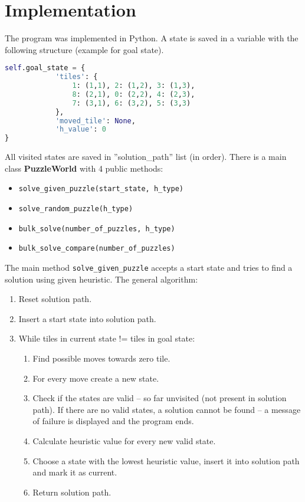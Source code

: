 \documentclass{article}
\begin{document}
\section{Implementation}
The program was implemented in Python. A state is saved in a variable with the following structure (example for goal state).
\begin{lstlisting}[language=python]
self.goal_state = {
            'tiles': {
                1: (1,1), 2: (1,2), 3: (1,3),
                8: (2,1), 0: (2,2), 4: (2,3),
                7: (3,1), 6: (3,2), 5: (3,3)
            },
            'moved_tile': None,
            'h_value': 0
}
\end{lstlisting}
All visited states are saved in ''solution\_path'' list (in order). There is a main class \textbf{PuzzleWorld} with 4 public methods: 
\begin{itemize}
\item \verb|solve_given_puzzle(start_state, h_type)|
\item \verb|solve_random_puzzle(h_type)|
\item \verb|bulk_solve(number_of_puzzles, h_type)|
\item \verb|bulk_solve_compare(number_of_puzzles)|
\end{itemize}

The main method \verb|solve_given_puzzle| accepts a start state and tries to find a solution using given heuristic. The general algorithm:
\begin{enumerate}
\item Reset solution path.
\item Insert a start state into solution path.
\item While tiles in current state != tiles in goal state:
	\begin{enumerate}
	\item Find possible moves towards zero tile.
           \item For every move create a new state.
           \item Check if the states are valid -- so far unvisited (not present in solution path). If there are no valid states, a solution cannot be found -- a message of failure is displayed and the program ends.
           \item Calculate heuristic value for every new valid state.
           \item Choose a state with the lowest heuristic value, insert it into solution path and mark it as current.
           \item Return solution path.
	\end{enumerate}
\end{enumerate}
\end{document}

